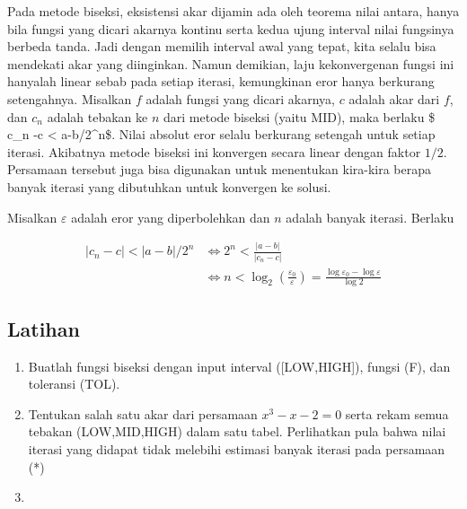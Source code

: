     Pada metode biseksi, eksistensi akar dijamin ada oleh teorema nilai
antara, hanya bila fungsi yang dicari akarnya kontinu serta kedua ujung
interval nilai fungsinya berbeda tanda. Jadi dengan memilih interval
awal yang tepat, kita selalu bisa mendekati akar yang diinginkan. Namun
demikian, laju kekonvergenan fungsi ini hanyalah linear sebab pada
setiap iterasi, kemungkinan eror hanya berkurang setengahnya. Misalkan
\(f\) adalah fungsi yang dicari akarnya, \(c\) adalah akar dari \(f\),
dan \(c_n\) adalah tebakan ke \(n\) dari metode biseksi (yaitu MID),
maka berlaku \$ \textbar c\_n -c\textbar{} \textless{}
\textbar a-b\textbar/2\^{}n\$. Nilai absolut eror selalu berkurang
setengah untuk setiap iterasi. Akibatnya metode biseksi ini konvergen
secara linear dengan faktor \(1/2\). Persamaan tersebut juga bisa
digunakan untuk menentukan kira-kira berapa banyak iterasi yang
dibutuhkan untuk konvergen ke solusi.

Misalkan \(\varepsilon\) adalah eror yang diperbolehkan dan \(n\) adalah
banyak iterasi. Berlaku


\begin{align}
|c_n - c| < |a-b|/2^n &\iff 2^n < \frac{|a-b|}{|c_n - c|} \\ 
&\iff n < \log_2 \left(\frac{\varepsilon_0}{ \varepsilon} \right) = \frac{\log \varepsilon_0 - \log \varepsilon}{\log 2}
\end{align}

    \hypertarget{latihan}{%
\subsection{Latihan}\label{latihan}}

    \begin{enumerate}
\def\labelenumi{\arabic{enumi}.}
\tightlist
\item
  Buatlah fungsi biseksi dengan input interval ({[}LOW,HIGH{]}), fungsi
  (F), dan toleransi (TOL).
\item
  Tentukan salah satu akar dari persamaan \(x^3 - x -2 =0\) serta rekam
  semua tebakan (LOW,MID,HIGH) dalam satu tabel. Perlihatkan pula bahwa
  nilai iterasi yang didapat tidak melebihi estimasi banyak iterasi pada
  persamaan (*)
\item
\end{enumerate}


    
    
    
